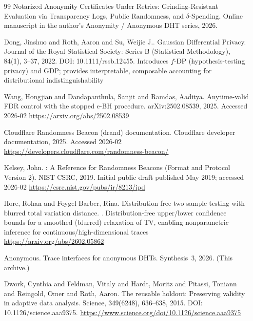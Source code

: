 \documentclass[11pt]{article}
\begin{document}
\begin{thebibliography}{99}
\newblock Notarized Anonymity Certificates Under Retries: Grinding-Resistant Evaluation via Transparency Logs, Public Randomness, and $\delta$-Spending.
\newblock Online manuscript in the author's Anonymity / Anonymous DHT series, 2026.

Dong, Jinshuo and Roth, Aaron and Su, Weijie J..
\newblock Gaussian Differential Privacy.
\newblock Journal of the Royal Statistical Society: Series B (Statistical Methodology), 84(1), 3--37, 2022.
\newblock DOI: 10.1111/rssb.12455.
\newblock Introduces $f$-DP (hypothesis-testing privacy) and GDP; provides interpretable, composable accounting for distributional indistinguishability

Wang, Hongjian and Dandapanthula, Sanjit and Ramdas, Aaditya.
\newblock Anytime-valid FDR control with the stopped e-BH procedure.
\newblock arXiv:2502.08539, 2025.
\newblock Accessed 2026-02
\newblock \url{https://arxiv.org/abs/2502.08539}

\newblock Cloudflare Randomness Beacon (drand) documentation.
\newblock Cloudflare developer documentation, 2025.
\newblock Accessed 2026-02
\newblock \url{https://developers.cloudflare.com/randomness-beacon/}

Kelsey, John.
: A Reference for Randomness Beacons (Format and Protocol Version 2).
\newblock NIST CSRC, 2019.
\newblock Initial public draft published May 2019; accessed 2026-02
\newblock \url{https://csrc.nist.gov/pubs/ir/8213/ipd}

Hore, Rohan and Foygel Barber, Rina.
\newblock Distribution-free two-sample testing with blurred total variation distance.
.
\newblock Distribution-free upper/lower confidence bounds for a smoothed (blurred) relaxation of TV, enabling nonparametric inference for continuous/high-dimensional traces
\newblock \url{https://arxiv.org/abs/2602.05862}

Anonymous.
\newblock Trace interfaces for anonymous DHTs.
\newblock Synthesis~3, 2026. (This archive.)

Dwork, Cynthia and Feldman, Vitaly and Hardt, Moritz and Pitassi, Toniann and Reingold, Omer and Roth, Aaron.
\newblock The reusable holdout: Preserving validity in adaptive data analysis.
\newblock Science, 349(6248), 636--638, 2015.
\newblock DOI: 10.1126/science.aaa9375.
\newblock \url{https://www.science.org/doi/10.1126/science.aaa9375}


\end{thebibliography}
\end{document}

